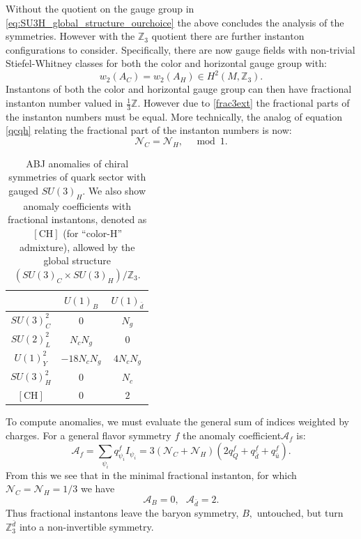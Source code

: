 \documentclass[11pt,a4paper]{article}
\begin{document}
Without the quotient on the gauge group in \eqref{eq:SU3H_global_structure_ourchoice} the above concludes the analysis of the symmetries.  However with the $\mathbb{Z}_{3}$ quotient there are further instanton configurations to consider.   Specifically, there are now gauge fields with non-trivial Stiefel-Whitney classes for both the color and horizontal gauge group with:
\begin{equation}\label{frac3ext}
    w_{2}(A_{C})=w_{2}(A_{H})\in H^{2}(M,\mathbb{Z}_{3}).
\end{equation}
Instantons of both the color and horizontal gauge group can then have fractional instanton number valued in $\frac{1}{3}\mathbb{Z}$.  However due to \eqref{frac3ext} the fractional parts of the instanton numbers must be equal. More technically, the analog of equation \eqref{qcqh} relating the fractional part of the instanton numbers is now:
\begin{equation}
    \mathcal{N}_{C}=\mathcal{N}_{H},~~~\mod 1.
\end{equation}



\begin{table}[t]\centering
\large
\begin{tabular}{|c|c|c|}  \hline
 & $U(1)_{B}$  & $U(1)_{\bar{d}}$ \\ \hline
 
$SU(3)_C^{2}$ & $0$ & $N_g$ \\ \hline 

$SU(2)_L^{2}$ & $N_c N_g$ & $0$ \\ \hline 

$U(1)_Y^{2}$ & $-18 N_c N_g$ & $4 N_c N_g$ \\ \hline 

$SU(3)_H^{2}$ & $0$ & $N_c$ \\ \hline 

$[\text{CH}]$ & $0$ & $2$ \\ \hline 

\end{tabular}\caption{ABJ anomalies of chiral symmetries of quark sector with gauged $SU(3)_H$. We also show anomaly coefficients with fractional instantons, denoted as $[\text{CH}]$ (for ``color-H'' admixture), allowed by the global structure $(SU(3)_C \times 
SU(3)_H) / \mathbb{Z}_3$.}
\label{tab:Interm_anomaly}
\end{table}

To compute anomalies, we must evaluate the general sum of indices weighted by charges.  For a general flavor symmetry $f$ the anomaly coefficient$\mathcal{A}_{f}$ is:
\begin{equation}
  \mathcal{A}_{f}=\sum_{\psi_{i}} q^{f}_{\psi_{i}}I_{\psi_i}=3(\mathcal{N}_{C}+\mathcal{N}_{H})(2q^{f}_{Q}+q^{f}_{\bar{d}}+q^{f}_{\bar{u}}).
\end{equation}
From this we see that in the minimal fractional instanton, for which $\mathcal{N}_{C}=\mathcal{N}_{H}=1/3$ we have
\begin{equation}
    \mathcal{A}_{B}=0,~~~\mathcal{A}_{\bar{d}}=2.
\end{equation}
Thus fractional instantons leave the baryon symmetry, $B,$ untouched, but turn $\mathbb{Z}_{3}^{\bar{d}}$ into a non-invertible symmetry.  
\end{document}
